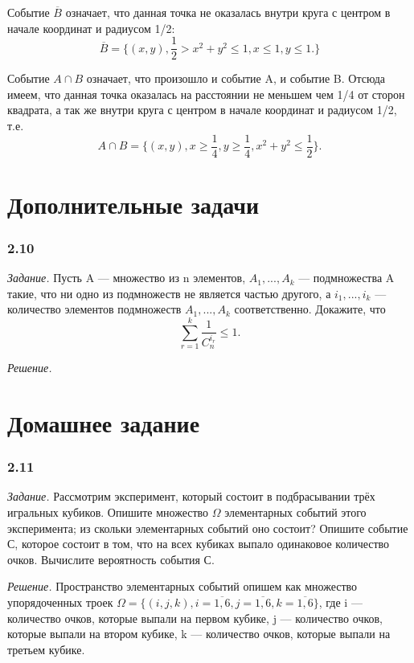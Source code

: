 \documentclass{book}
\begin{document}
Событие $\overline{B}$ означает, что данная точка не оказалась внутри круга с центром в начале координат и радиусом 1/2: $$\overline{B}=\{(x, y), \frac{1}{2}>x^2+y^2\leq 1, x\leq 1, y\leq 1.\}$$

Событие $A\cap B$ означает, что произошло и событие A, и событие B. Отсюда имеем, что данная точка оказалась на расстоянии не меньшем чем 1/4 от сторон квадрата, а так же внутри круга с центром в начале координат и радиусом 1/2, т.е. $$A\cap B=\{(x, y), x\geq\frac{1}{4}, y\geq\frac{1}{4}, x^2+y^2\leq\frac{1}{2}\}.$$

\section*{Дополнительные задачи}

\subsubsection*{2.10}

\textit{Задание.} Пусть A --- множество из n элементов, $A_1, ..., A_k$ --- подмножества A такие, что ни одно из подмножеств не является частью другого, а $i_1, ..., i_k$ --- количество элементов подмножеств $A_1, ..., A_k$ соответственно. Докажите, что $$\sum\limits_{r=1}^k\frac{1}{C_n^{i_r}}\leq 1.$$

\textit{Решение.}

\section*{Домашнее задание}

\subsubsection*{2.11}

\textit{Задание.} Рассмотрим эксперимент, который состоит в подбрасывании трёх игральных кубиков. Опишите множество $\Omega$ элементарных событий этого эксперимента; из скольки элементарных событий оно состоит? Опишите событие С, которое состоит в том, что на всех кубиках выпало одинаковое количество очков. Вычислите вероятность события С.

\textit{Решение.} Пространство элементарных событий опишем как множество упорядоченных троек $\Omega=\{\left(i, j, k\right), i=\overline{1, 6}, j=\overline{1, 6}, k=\overline{1, 6}\}$, где i --- количество очков, которые выпали на первом кубике, j --- количество очков, которые выпали на втором кубике, k --- количество очков, которые выпали на третьем кубике.
\end{document}
